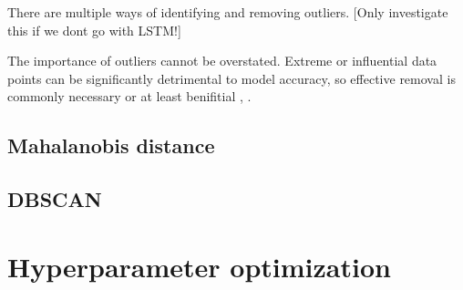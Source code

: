 There are multiple ways of identifying and removing outliers. [Only investigate this if we dont go with LSTM!] 

The importance of outliers cannot be overstated. Extreme or influential data points can be significantly detrimental to model accuracy, so effective removal is commonly necessary or at least benifitial \citep{osborne_overbay_2004}, \citep{hodge_austin_2004}. 

\subsection{Mahalanobis distance}

\subsection{DBSCAN}

\section{Hyperparameter optimization}



